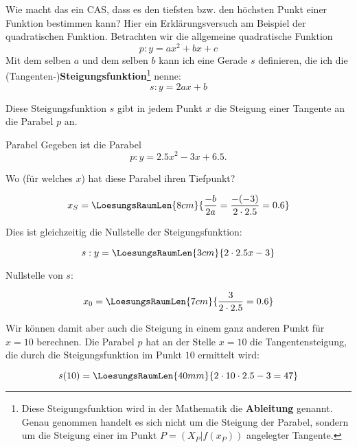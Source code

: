 Wie macht das ein CAS, dass es den tiefsten bzw. den höchsten Punkt
einer Funktion bestimmen kann? Hier ein Erklärungsversuch am Beispiel
der quadratischen Funktion.
Betrachten wir die allgemeine quadratische Funktion $$p: y=ax^2 + bx +
c$$
Mit dem selben $a$ und dem selben $b$ kann ich eine Gerade $s$
definieren, die ich die (Tangenten-)\textbf{Steigungsfunktion}\footnote{Diese
  Steigungsfunktion wird in der Mathematik die
  \textbf{Ableitung} genannt. Genau genommen handelt
  es sich nicht um die Steigung der Parabel, sondern um die Steigung
  einer im Punkt $P=(X_P|f(x_P))$ angelegter Tangente.} nenne:
$$s: y= 2ax+b$$
\newpage


Diese Steigungsfunktion $s$ gibt in jedem Punkt $x$ die Steigung einer
Tangente an die Parabel $p$ an.

\begin{beispiel}{Parabel}{}
  Gegeben ist die Parabel $$p: y=2.5x^2 - 3x + 6.5\text{.}$$

  Wo (für welches $x$) hat diese Parabel
  ihren Tiefpunkt? 

  $$x_S =   \LoesungsRaumLen{8cm}{\frac{-b}{2a} = \frac{-(-3)}{2\cdot{}2.5} = 0.6}$$

  Dies ist gleichzeitig die Nullstelle der
  Steigungsfunktion:

  $$s: y= \LoesungsRaumLen{3cm}{2\cdot{}2.5x - 3}$$

  Nullstelle von $s$:

  $$x_0 = \LoesungsRaumLen{7cm}{\frac{3}{2\cdot{}2.5} = 0.6}$$

  Wir können damit aber auch die Steigung in einem ganz anderen Punkt
  \zB für $x=10$ berechnen. Die Parabel $p$ hat an der Stelle $x=10$
  die Tangentensteigung, die durch die Steigungsfunktion im Punkt $10$
  ermittelt wird:

  $$s(10) = \LoesungsRaumLen{40mm}{2\cdot{}10\cdot{2.5} - 3 = 47}$$
  
\end{beispiel}
\newpage

